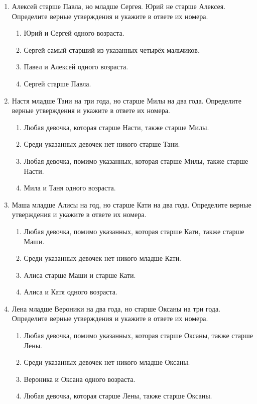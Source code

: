 \documentclass[a4paper,12pt]{article}
\newcommand{\taskspace}{\par\vspace{0.42cm}}
\begin{document}
\begin{enumerate}[resume]
\taskspace

\item Алексей старше Павла, но младше Сергея. Юрий не старше Алексея. Определите верные утверждения и укажите в ответе их номера.
\begin{enumerate}[label=\arabic*),leftmargin=8mm,itemsep=0.25em,topsep=0.35em]
\item Юрий и Сергей одного возраста.
\item Сергей самый старший из указанных четырёх мальчиков.
\item Павел и Алексей одного возраста.
\item Сергей старше Павла.
\end{enumerate}

\taskspace

\item Настя младше Тани на три года, но старше Милы на два года. Определите верные утверждения и укажите в ответе их номера.
\begin{enumerate}[label=\arabic*),leftmargin=8mm,itemsep=0.25em,topsep=0.35em]
\item Любая девочка, которая старше Насти, также старше Милы.
\item Среди указанных девочек нет никого старше Тани.
\item Любая девочка, помимо указанных, которая старше Милы, также старше Насти.
\item Мила и Таня одного возраста.
\end{enumerate}

\taskspace

\item Маша младше Алисы на год, но старше Кати на два года. Определите верные утверждения и укажите в ответе их номера.
\begin{enumerate}[label=\arabic*),leftmargin=8mm,itemsep=0.25em,topsep=0.35em]
\item Любая девочка, помимо указанных, которая старше Кати, также старше Маши.
\item Среди указанных девочек нет никого младше Кати.
\item Алиса старше Маши и старше Кати.
\item Алиса и Катя одного возраста.
\end{enumerate}

\taskspace

\item Лена младше Вероники на два года, но старше Оксаны на три года. Определите верные утверждения и укажите в ответе их номера.
\begin{enumerate}[label=\arabic*),leftmargin=8mm,itemsep=0.25em,topsep=0.35em]
\item Любая девочка, помимо указанных, которая старше Оксаны, также старше Лены.
\item Среди указанных девочек нет никого младше Оксаны.
\item Вероника и Оксана одного возраста.
\item Любая девочка, которая старше Лены, также старше Оксаны.
\end{enumerate}


\end{enumerate}
\end{document}
